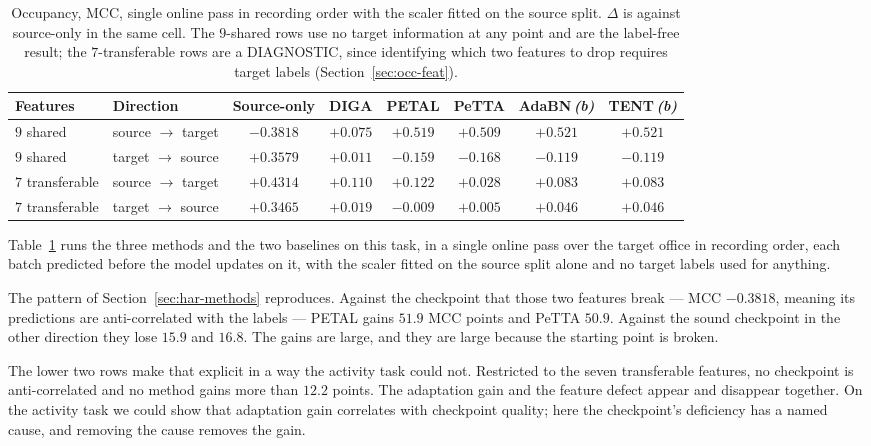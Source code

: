 \documentclass[a4paper,fleqn]{cas-dc}
\begin{document}
\begin{table}[t]
\centering
\caption{Occupancy, MCC, single online pass in recording order with the scaler fitted on
the source split. $\Delta$ is against source-only in the same cell. The $9$-shared rows use
no target information at any point and are the label-free result; the $7$-transferable rows
are a DIAGNOSTIC, since identifying which two features to drop requires target labels
(Section~\ref{sec:occ-feat}).}
\label{tab:occmethods}
\small
\begin{tabular}{llcccccc}
\toprule
Features & Direction & Source-only & DIGA & PETAL & PeTTA & AdaBN\,\emph{(b)} & TENT\,\emph{(b)} \\
\midrule
$9$ shared & source $\to$ target & $-0.3818$ & $+0.075$ & $\mathbf{+0.519}$ & $\mathbf{+0.509}$ & $+0.521$ & $+0.521$ \\
$9$ shared & target $\to$ source & $+0.3579$ & $+0.011$ & $-0.159$ & $-0.168$ & $-0.119$ & $-0.119$ \\
\addlinespace[2pt]
$7$ transferable & source $\to$ target & $+0.4314$ & $+0.110$ & $+0.122$ & $+0.028$ & $+0.083$ & $+0.083$ \\
$7$ transferable & target $\to$ source & $+0.3465$ & $+0.019$ & $-0.009$ & $+0.005$ & $+0.046$ & $+0.046$ \\
\bottomrule
\end{tabular}
\end{table}

Table~\ref{tab:occmethods} runs the three methods and the two baselines on this task, in a
single online pass over the target office in recording order, each batch predicted before
the model updates on it, with the scaler fitted on the source split alone and no target
labels used for anything.

The pattern of Section~\ref{sec:har-methods} reproduces. Against the checkpoint that those two features
break --- MCC $-0.3818$, meaning its predictions are anti-correlated
with the labels --- PETAL gains $51.9$ MCC points and PeTTA $50.9$. Against the sound
checkpoint in the other direction they lose $15.9$ and $16.8$. The gains are large, and
they are large because the starting point is broken.

The lower two rows make that explicit in a way the activity task could not. Restricted to
the seven transferable features, no checkpoint is anti-correlated and no method gains more
than $12.2$ points. The adaptation gain and the feature defect appear and disappear
together. On the activity task we could show that adaptation gain correlates with
checkpoint quality; here the checkpoint's deficiency has a named cause, and removing the
cause removes the gain.
\end{document}

